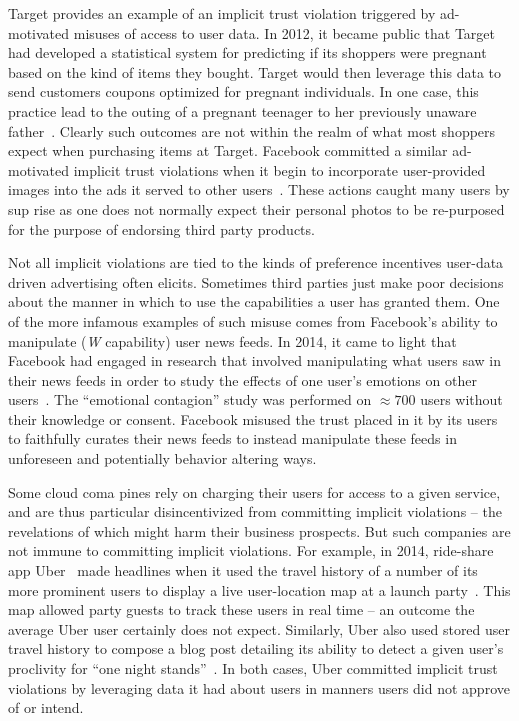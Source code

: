 Target provides an example of an implicit trust violation triggered by
ad-motivated misuses of access to user data. In 2012, it became public
that Target had developed a statistical system for predicting if its
shoppers were pregnant based on the kind of items they bought. Target
would then leverage this data to send customers coupons optimized for
pregnant individuals. In one case, this practice lead to the outing of
a pregnant teenager to her previously unaware
father~\cite{hill2012}. Clearly such outcomes are not within the realm
of what most shoppers expect when purchasing items at Target. Facebook
committed a similar ad-motivated implicit trust violations when it
begin to incorporate user-provided images into the ads it served to
other users~\cite{mashable-socialads}. These actions caught many users
by sup rise as one does not normally expect their personal photos to
be re-purposed for the purpose of endorsing third party products.

Not all implicit violations are tied to the kinds of preference
incentives user-data driven advertising often elicits. Sometimes third
parties just make poor decisions about the manner in which to use the
capabilities a user has granted them. One of the more infamous
examples of such misuse comes from Facebook's ability to manipulate
(\emph{W} capability) user news feeds. In 2014, it came to light that
Facebook had engaged in research that involved manipulating what users
saw in their news feeds in order to study the effects of one user's
emotions on other users~\cite{goel2014}. The ``emotional contagion''
study was performed on $\approx700$ users without their knowledge or
consent. Facebook misused the trust placed in it by its users to
faithfully curates their news feeds to instead manipulate these feeds
in unforeseen and potentially behavior altering ways.

Some cloud coma pines rely on charging their users for access to a
given service, and are thus particular disincentivized from committing
implicit violations -- the revelations of which might harm their
business prospects. But such companies are not immune to committing
implicit violations. For example, in 2014, ride-share app
Uber~\cite{uber} made headlines when it used the travel history of a
number of its more prominent users to display a live user-location map
at a launch party~\cite{sims2014}. This map allowed party guests to
track these users in real time -- an outcome the average Uber user
certainly does not expect. Similarly, Uber also used stored user
travel history to compose a blog post detailing its ability to detect
a given user's proclivity for ``one night
stands''~\cite{pagliery2014}. In both cases, Uber committed implicit
trust violations by leveraging data it had about users in manners
users did not approve of or intend.

